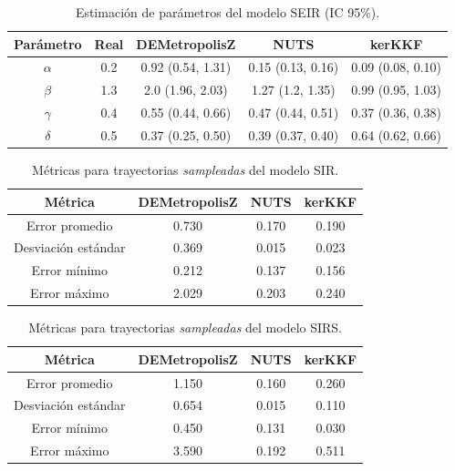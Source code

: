 \begin{table}[h!]
    \centering
    \caption{Estimación de parámetros del modelo SEIR (IC 95\%).} 
    \begin{tabular}{|c|c|c|c|c|}
    \hline
    \textbf{Parámetro}& \textbf{Real} & \textbf{DEMetropolisZ} & \textbf{NUTS} & \textbf{kerKKF}  \\ \hline
    $\alpha$ & 0.2 & 0.92 (0.54, 1.31) & 0.15 (0.13, 0.16) & 0.09 (0.08, 0.10) \\ \hline
    $\beta$ & 1.3 & 2.0 (1.96, 2.03) & 1.27 (1.2, 1.35) & 0.99 (0.95, 1.03) \\  \hline
    $\gamma$ & 0.4 & 0.55 (0.44, 0.66) & 0.47 (0.44, 0.51)
 & 0.37 (0.36, 0.38)\\ \hline
    $\delta$ & 0.5 & 0.37 (0.25, 0.50) & 0.39 (0.37, 0.40) & 0.64 (0.62, 0.66)\\ \hline
    \end{tabular}
    \label{tab:SEIR_params}
\end{table}

\begin{table}[h!]
    \centering
    \begin{tabular}{|c|c|c|c|}
    \hline
    \textbf{Métrica} & \textbf{DEMetropolisZ} & \textbf{NUTS} & \textbf{kerKKF} \\
    \hline
    Error promedio & 0.730 & 0.170 & 0.190 \\
    \hline
Desviación estándar & 0.369 & 0.015 & 0.023 \\
    \hline
Error mínimo & 0.212 & 0.137 & 0.156 \\
    \hline
Error máximo & 2.029 & 0.203 & 0.240 \\
    \hline
    \end{tabular}
    \caption{Métricas para trayectorias \textit{sampleadas} del modelo SIR.}
    \label{tab:metricas_traj_SIR}
\end{table}

\begin{table}[h!]
    \centering
    \begin{tabular}{|c|c|c|c|}
\hline
\textbf{Métrica} & \textbf{DEMetropolisZ} & \textbf{NUTS} & \textbf{kerKKF} \\
\hline
Error promedio & 1.150 & 0.160 & 0.260 \\
\hline
Desviación estándar & 0.654 & 0.015 & 0.110 \\
\hline
Error mínimo & 0.450 & 0.131 & 0.030 \\
\hline
Error máximo & 3.590 & 0.192 & 0.511 \\
\hline
\end{tabular}
    \caption{Métricas para trayectorias \textit{sampleadas} del modelo SIRS.}
    \label{tab:metricas_traj_SIRS}
\end{table}

